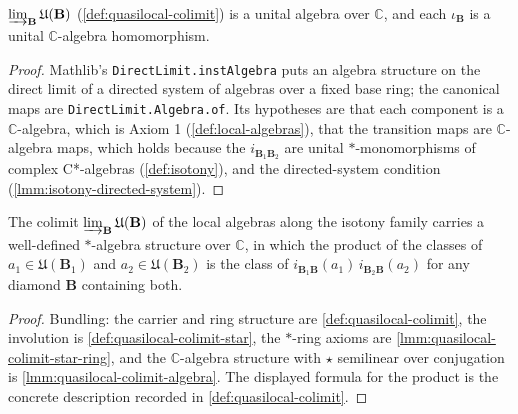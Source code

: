 \begin{lemma}
    \label{lmm:quasilocal-colimit-algebra}
    $\varinjlim_{\mathbf{B}} \mathfrak{U}(\mathbf{B})$ (\ref{def:quasilocal-colimit}) is a unital algebra over $\mathbb{C}$, and each $\iota_{\mathbf{B}}$ is a unital $\mathbb{C}$-algebra homomorphism.
\end{lemma}
\begin{proof}
    Mathlib's \texttt{DirectLimit.instAlgebra} puts an algebra structure on the direct limit of a directed system of algebras over a fixed base ring; the canonical maps are \texttt{DirectLimit.Algebra.of}. Its hypotheses are that each component is a $\mathbb{C}$-algebra, which is Axiom 1 (\ref{def:local-algebras}), that the transition maps are $\mathbb{C}$-algebra maps, which holds because the $i_{\mathbf{B}_1\mathbf{B}_2}$ are unital $*$-monomorphisms of complex C*-algebras (\ref{def:isotony}), and the directed-system condition (\ref{lmm:isotony-directed-system}).
\end{proof}

\begin{lemma}
    \label{lmm:quasilocal-colimit-star-algebra}
    The colimit $\varinjlim_{\mathbf{B}} \mathfrak{U}(\mathbf{B})$ of the local algebras along the isotony family carries a well-defined $*$-algebra structure over $\mathbb{C}$, in which the product of the classes of $a_1 \in \mathfrak{U}(\mathbf{B}_1)$ and $a_2 \in \mathfrak{U}(\mathbf{B}_2)$ is the class of $i_{\mathbf{B}_1\mathbf{B}}(a_1)\, i_{\mathbf{B}_2\mathbf{B}}(a_2)$ for any diamond $\mathbf{B}$ containing both.
\end{lemma}
\begin{proof}
    Bundling: the carrier and ring structure are \ref{def:quasilocal-colimit}, the involution is \ref{def:quasilocal-colimit-star}, the $*$-ring axioms are \ref{lmm:quasilocal-colimit-star-ring}, and the $\mathbb{C}$-algebra structure with $\star$ semilinear over conjugation is \ref{lmm:quasilocal-colimit-algebra}. The displayed formula for the product is the concrete description recorded in \ref{def:quasilocal-colimit}.
\end{proof}

